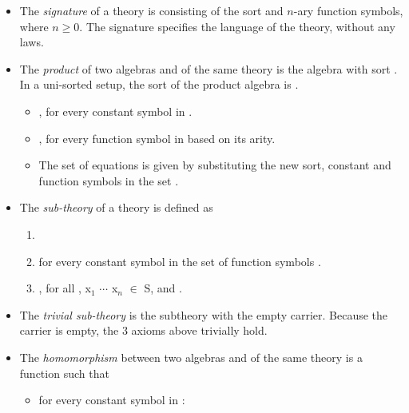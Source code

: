 \begin{itemize}
    \item The \emph{signature} of a theory   is  consisting of the sort and $n$-ary function symbols, where $n \geq 0$. The signature specifies the language of the theory, without any laws. 
    \item The \emph{product} of two algebras  and  of the same theory  is the algebra with sort . In a uni-sorted setup, the sort of the product algebra is . 
    \begin{itemize}
    \item {}, for every constant symbol  in . 
    \item {}, for every function symbol  in  based on its arity. 
    \item The set of equations  is given by substituting the new sort, constant and function symbols in the set .  
    \end{itemize}
    \item The \emph{sub-theory}  of a theory  is defined as 
    \begin{enumerate}
    \item {} \lstmath{$\subseteq$} 
    \item {} \lstmath{=}  for every constant symbol in the set of function symbols . 
    \item {} \lstmath{=} , for all , {x$_1$ $\cdots$ x$_n$ $\in$ S}, and . 
    \end{enumerate}
    \item The \emph{trivial sub-theory} is the subtheory with the empty carrier. Because the carrier is empty, the $3$ axioms above trivially hold. 
    \item The \emph{homomorphism} between two algebras  and  of the same theory  is a function  such that 
    \begin{itemize}
        \item for every constant symbol in :  

\end{itemize}
\end{itemize}
